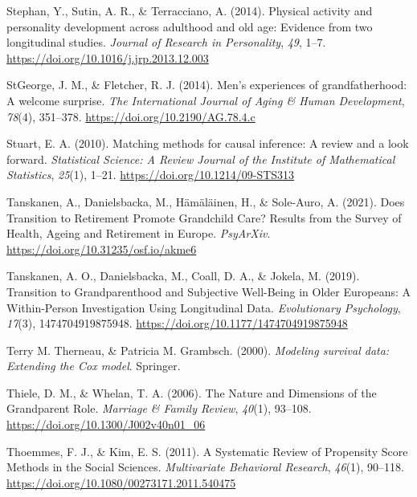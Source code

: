 \documentclass[
  english,
  man,floatsintext]{apa7}
\begin{document}
\leavevmode\hypertarget{ref-stephanPhysicalActivityPersonality2014}{}%
Stephan, Y., Sutin, A. R., \& Terracciano, A. (2014). Physical activity and personality development across adulthood and old age: Evidence from two longitudinal studies. \emph{Journal of Research in Personality}, \emph{49}, 1--7. \url{https://doi.org/10.1016/j.jrp.2013.12.003}

\leavevmode\hypertarget{ref-stgeorgeMenExperiencesGrandfatherhood2014}{}%
StGeorge, J. M., \& Fletcher, R. J. (2014). Men's experiences of grandfatherhood: A welcome surprise. \emph{The International Journal of Aging \& Human Development}, \emph{78}(4), 351--378. \url{https://doi.org/10.2190/AG.78.4.c}

\leavevmode\hypertarget{ref-stuartMatchingMethodsCausal2010}{}%
Stuart, E. A. (2010). Matching methods for causal inference: A review and a look forward. \emph{Statistical Science: A Review Journal of the Institute of Mathematical Statistics}, \emph{25}(1), 1--21. \url{https://doi.org/10.1214/09-STS313}

\leavevmode\hypertarget{ref-tanskanenDoesTransitionRetirement2021}{}%
Tanskanen, A., Danielsbacka, M., Hämäläinen, H., \& Sole-Auro, A. (2021). Does Transition to Retirement Promote Grandchild Care? Results from the Survey of Health, Ageing and Retirement in Europe. \emph{PsyArXiv}. \url{https://doi.org/10.31235/osf.io/akme6}

\leavevmode\hypertarget{ref-tanskanenTransitionGrandparenthoodSubjective2019}{}%
Tanskanen, A. O., Danielsbacka, M., Coall, D. A., \& Jokela, M. (2019). Transition to Grandparenthood and Subjective Well-Being in Older Europeans: A Within-Person Investigation Using Longitudinal Data. \emph{Evolutionary Psychology}, \emph{17}(3), 1474704919875948. \url{https://doi.org/10.1177/1474704919875948}

\leavevmode\hypertarget{ref-R-survival-book}{}%
Terry M. Therneau, \& Patricia M. Grambsch. (2000). \emph{Modeling survival data: Extending the Cox model}. Springer.

\leavevmode\hypertarget{ref-thieleNatureDimensionsGrandparent2006a}{}%
Thiele, D. M., \& Whelan, T. A. (2006). The Nature and Dimensions of the Grandparent Role. \emph{Marriage \& Family Review}, \emph{40}(1), 93--108. \url{https://doi.org/10.1300/J002v40n01_06}

\leavevmode\hypertarget{ref-thoemmesSystematicReviewPropensity2011}{}%
Thoemmes, F. J., \& Kim, E. S. (2011). A Systematic Review of Propensity Score Methods in the Social Sciences. \emph{Multivariate Behavioral Research}, \emph{46}(1), 90--118. \url{https://doi.org/10.1080/00273171.2011.540475}
\end{document}
